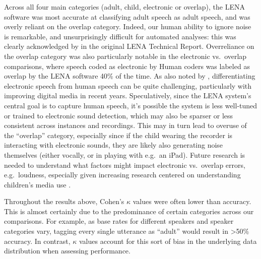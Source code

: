 \documentclass[man,floatsintext]{apa6}
\theoremstyle{definition}
\theoremstyle{definition}
\theoremstyle{definition}
\theoremstyle{remark}
\begin{document}
Across all four main categories (adult, child, electronic or overlap),
the LENA software was most accurate at classifying adult speech as adult
speech, and was overly reliant on the overlap category. Indeed, our
human ability to ignore noise is remarkable, and unsurprisingly
difficult for automated analyses: this was clearly acknowledged by
\citet{Xu2009} in the original LENA Technical Report. Overreliance on
the overlap category was also particularly notable in the electronic
vs.~overlap comparisons, where speech coded as electronic by Human
coders was labeled as overlap by the LENA software 40\% of the time. As
also noted by \citet{Xu2008}, differentiating electronic speech from
human speech can be quite challenging, particularly with improving
digital media in recent years. Speculatively, since the LENA system's
central goal is to capture human speech, it's possible the system is
less well-tuned or trained to electronic sound detection, which may also
be sparser or less consistent across instances and recordings. This may
in turn lead to overuse of the \enquote{overlap} category, especially
since if the child wearing the recorder is interacting with electronic
sounds, they are likely also generating noise themselves (either
vocally, or in playing with e.g.~an iPad). Future research is needed to
understand what factors might impact electronic vs.~overlap errors,
e.g.~loudness, especially given increasing research centered on
understanding children's media use \citep{Christakis2009}.

Throughout the results above, Cohen's \(\kappa\) values were often lower
than accuracy. This is almost certainly due to the predominance of
certain categories across our comparisons. For example, as base rates
for different speakers and speaker categories vary, tagging every single
utterance as \enquote{adult} would result in \textgreater50\% accuracy.
In contrast, \(\kappa\) values account for this sort of bias in the
underlying data distribution when assessing performance.
\end{document}
